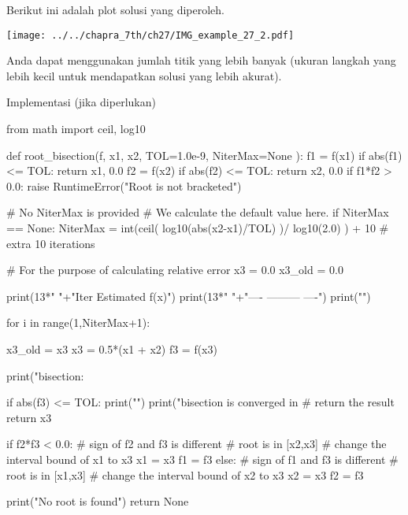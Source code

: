 Berikut ini adalah plot solusi yang diperoleh.

{\centering
\texttt{[image: ../../chapra\_7th/ch27/IMG\_example\_27\_2.pdf]}
\par}

Anda dapat menggunakan jumlah titik yang lebih banyak (ukuran langkah yang lebih
kecil untuk mendapatkan solusi yang lebih akurat).

Implementasi  (jika diperlukan)
\begin{pythoncode}
from math import ceil, log10

def root_bisection(f, x1, x2, TOL=1.0e-9, NiterMax=None ):
    f1 = f(x1)
    if abs(f1) <= TOL:
        return x1, 0.0
    f2 = f(x2)
    if abs(f2) <= TOL:
        return x2, 0.0
    if f1*f2 > 0.0:
        raise RuntimeError("Root is not bracketed")

    # No NiterMax is provided
    # We calculate the default value here.
    if NiterMax == None:
        NiterMax = int(ceil( log10(abs(x2-x1)/TOL) )/ log10(2.0) ) + 10
        # extra 10 iterations

    # For the purpose of calculating relative error
    x3 = 0.0
    x3_old = 0.0

    print(13*" "+"Iter      Estimated          f(x)")
    print(13*" "+"----      ---------          ----")
    print("")

    for i in range(1,NiterMax+1):

        x3_old = x3
        x3 = 0.5*(x1 + x2)
        f3 = f(x3)

        print("bisection: %

        if abs(f3) <= TOL:
            print("")
            print("bisection is converged in %
            # return the result
            return x3

        if f2*f3 < 0.0:
            # sign of f2 and f3 is different
            # root is in [x2,x3]
            # change the interval bound of x1 to x3
            x1 = x3
            f1 = f3
        else:
            # sign of f1 and f3 is different
            # root is in [x1,x3]
            # change the interval bound of x2 to x3
            x2 = x3
            f2 = f3

    print("No root is found")
    return None
\end{pythoncode}
